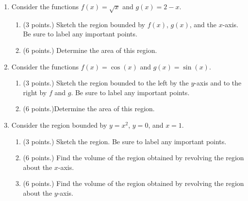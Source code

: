 \documentclass[12pt]{article}
\newcommand{\points}[1]{(#1 points.)}		%
\begin{document}
\begin{enumerate}

\item Consider the functions $f(x) = \sqrt{x}$ and $g(x) = 2-x$.

  \begin{enumerate}

  \item \points{3} Sketch the region bounded by $f(x)$, $g(x)$, and
    the $x$-axis. Be sure to label any important points.
    \vfill

  \item \points{6} Determine the area of this region.
    \vfill

  \end{enumerate}

  \newpage
  
\item Consider the functions $f(x) = \cos(x)$ and $g(x) = \sin(x)$.

  \begin{enumerate}

  \item \points{3} Sketch the region bounded to the left by the $y$-axis and to
    the right by $f$ and $g$. Be sure to label any important points.
    \vfill

  \item \points{6}Determine the area of this region.
    \vfill

  \end{enumerate}

  \newpage

\item Consider the region bounded by $y=x^2$, $y=0$, and $x=1$.

  \begin{enumerate}

  \item \points{3} Sketch the region. Be sure to label any important points.

    \vfill

  \item \points{6} Find the volume of the region obtained by revolving
    the region
    about the $x$-axis.

    \vfill

    \newpage

  \item \points{6} Find the volume of the region obtained by revolving
    the region
    about the $y$-axis.
    
  \end{enumerate}
    
\end{enumerate}
\end{document}
